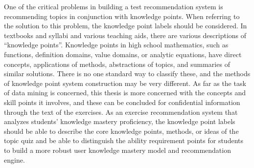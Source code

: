 One of the critical problems in building a test recommendation system is recommending topics in conjunction with knowledge points. When referring to the solution to this problem, the knowledge point labels should be considered. In textbooks and syllabi and various teaching aids, there are various descriptions of ``knowledge points''. Knowledge points in high school mathematics, such as functions, definition domains, value domains, or analytic equations, have direct concepts, applications of methods, abstractions of topics, and summaries of similar solutions. There is no one standard way to classify these, and the methods of knowledge point system construction may be very different. As far as the task of data mining is concerned, this thesis is more concerned with the concepts and skill points it involves, and these can be concluded for confidential information through the text of the exercises. As an exercise recommendation system that analyzes students' knowledge mastery proficiency, the knowledge point labels should be able to describe the core knowledge points, methods, or ideas of the topic quiz and be able to distinguish the ability requirement points for students to build a more robust user knowledge mastery model and recommendation engine.



